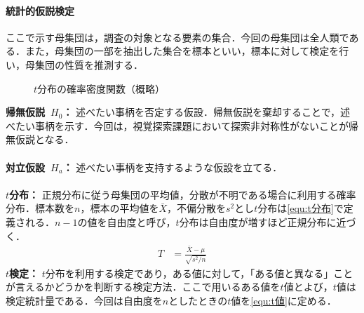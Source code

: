 \paragraph{統計的仮説検定}
ここで示す母集団は，調査の対象となる要素の集合．今回の母集団は全人類である．また，母集団の一部を抽出した集合を標本といい，標本に対して検定を行い，母集団の性質を推測する．
\begin{oframed}
    \begin{figure}
        \centering
        \caption{\(t\)分布の確率密度関数（概略）}
        \vspace{-.5cm}
    \end{figure}
    \noindent\textbf{帰無仮説\ \(H_0\)：} 述べたい事柄を否定する仮設．帰無仮説を棄却することで，述べたい事柄を示す．今回は，視覚探索課題において探索非対称性がないことが帰無仮説となる．\\ \\
    \textbf{対立仮設\ \(H_a\)：} 述べたい事柄を支持するような仮設を立てる．\\ \\
    \textbf{\(t\)分布：} 正規分布に従う母集団の平均値，分散が不明である場合に利用する確率分布．標本数を\(n\)，標本の平均値を\(\bar{X}\)，不偏分散を\(s^2\)とし\(t\)分布は\eqref{equ:t分布}で定義される．\(n-1\)の値を自由度と呼び，\(t\)分布は自由度が増すほど正規分布に近づく\cite[p.178\ -\ p.179]{応用解析と情報数学}．
    \begin{align}
        T & =\frac{\bar{X}-\mu}{\sqrt{s^2/n}}\label{equ:t分布}
    \end{align}
    \textbf{\(t\)検定：} \(t\)分布を利用する検定であり，ある値に対して，「ある値と異なる」ことが言えるかどうかを判断する検定方法．ここで用いるある値を\(t\)値とよび，\(t\)値は検定統計量である．今回は自由度を\(n\)としたときの\(t\)値を\eqref{equ:t値}に定める．

\end{oframed}
